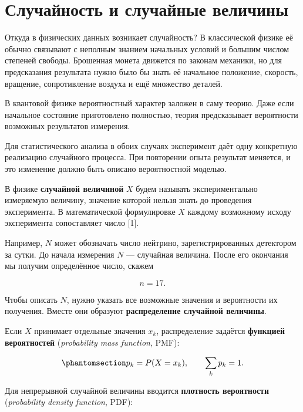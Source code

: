 \documentclass[
  russian,
  11pt,
  a4paper,
  open=any]{scrbook}
\begin{document}
\section{Случайность и случайные
величины}\label{ux441ux43bux443ux447ux430ux439ux43dux43eux441ux442ux44c-ux438-ux441ux43bux443ux447ux430ux439ux43dux44bux435-ux432ux435ux43bux438ux447ux438ux43dux44b}

Откуда в физических данных возникает случайность? В классической физике
её обычно связывают с неполным знанием начальных условий и большим
числом степеней свободы. Брошенная монета движется по законам механики,
но для предсказания результата нужно было бы знать её начальное
положение, скорость, вращение, сопротивление воздуха и ещё множество
деталей.

В квантовой физике вероятностный характер заложен в саму теорию. Даже
если начальное состояние приготовлено полностью, теория предсказывает
вероятности возможных результатов измерения.

Для статистического анализа в обоих случаях эксперимент даёт одну
конкретную реализацию случайного процесса. При повторении опыта
результат меняется, и это изменение должно быть описано вероятностной
моделью.

В физике \textbf{случайной величиной} \(X\) будем называть
экспериментально измеряемую величину, значение которой нельзя знать до
проведения эксперимента. В математической формулировке \(X\) каждому
возможному исходу эксперимента сопоставляет число {[}1{]}.

Например, \(N\) может обозначать число нейтрино, зарегистрированных
детектором за сутки. До начала измерения \(N\) --- случайная величина.
После его окончания мы получим определённое число, скажем

\[
n=17.
\]

Чтобы описать \(N\), нужно указать все возможные значения и вероятности
их получения. Вместе они образуют \textbf{распределение случайной
величины}.

Если \(X\) принимает отдельные значения \(x_k\), распределение задаётся
\textbf{функцией вероятностей} (\emph{probability mass function}, PMF):

\begin{equation}\protect\phantomsection\label{eq-discrete-probability-mass}{
p_k=P(X=x_k),
\qquad
\sum_k p_k=1.
}\end{equation}

Для непрерывной случайной величины вводится \textbf{плотность
вероятности} (\emph{probability density function}, PDF):
\end{document}
